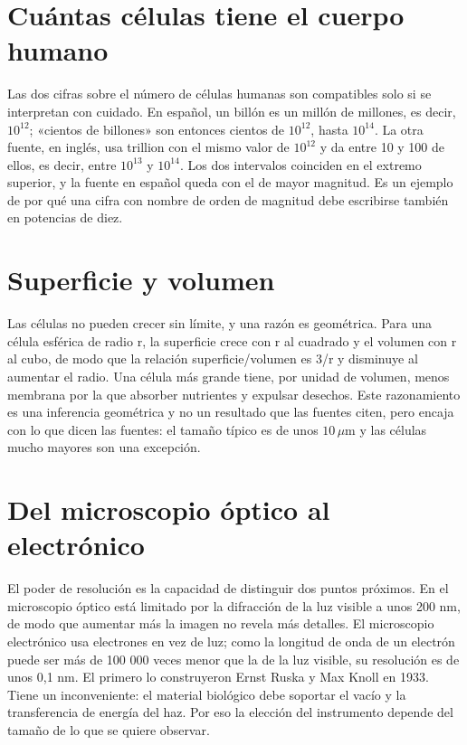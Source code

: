 \documentclass{book}
\begin{document}

\section{Cuántas células tiene el cuerpo humano}

Las dos cifras sobre el número de células humanas son compatibles solo si se interpretan con cuidado. En español, un billón es un millón de millones, es decir, \(10^{12}\); «cientos de billones» son entonces cientos de \(10^{12}\), hasta \(10^{14}\). La otra fuente, en inglés, usa trillion con el mismo valor de \(10^{12}\) y da entre 10 y 100 de ellos, es decir, entre \(10^{13}\) y \(10^{14}\). Los dos intervalos coinciden en el extremo superior, y la fuente en español queda con el de mayor magnitud. Es un ejemplo de por qué una cifra con nombre de orden de magnitud debe escribirse también en potencias de diez.


\section{Superficie y volumen}

Las células no pueden crecer sin límite, y una razón es geométrica. Para una célula esférica de radio r, la superficie crece con r al cuadrado y el volumen con r al cubo, de modo que la relación superficie/volumen es 3/r y disminuye al aumentar el radio. Una célula más grande tiene, por unidad de volumen, menos membrana por la que absorber nutrientes y expulsar desechos. Este razonamiento es una inferencia geométrica y no un resultado que las fuentes citen, pero encaja con lo que dicen las fuentes: el tamaño típico es de unos \(10\,\mu\mathrm{m}\) y las células mucho mayores son una excepción.


\section{Del microscopio óptico al electrónico}

El poder de resolución es la capacidad de distinguir dos puntos próximos. En el microscopio óptico está limitado por la difracción de la luz visible a unos 200 nm, de modo que aumentar más la imagen no revela más detalles. El microscopio electrónico usa electrones en vez de luz; como la longitud de onda de un electrón puede ser más de 100 000 veces menor que la de la luz visible, su resolución es de unos 0,1 nm. El primero lo construyeron Ernst Ruska y Max Knoll en 1933. Tiene un inconveniente: el material biológico debe soportar el vacío y la transferencia de energía del haz. Por eso la elección del instrumento depende del tamaño de lo que se quiere observar.
\end{document}
